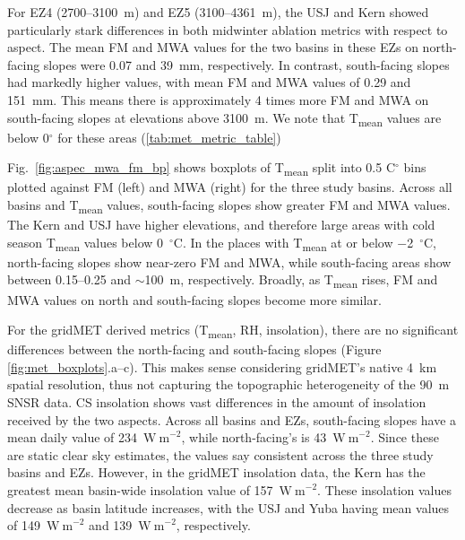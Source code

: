 For EZ4 (2700--3100~m) and EZ5 (3100--4361~m), the USJ and Kern showed particularly stark differences in both midwinter ablation metrics with respect to aspect. The mean FM and MWA values for the two basins in these EZs on north-facing slopes were 0.07 and 39~mm, respectively. In contrast, south-facing slopes had markedly higher values, with mean FM and MWA values of 0.29 and 151~mm. This means there is approximately 4 times more FM and MWA on south-facing slopes at elevations above 3100~m. We note that T\textsubscript{mean} values are below 0$^{\circ}$ for these areas (\ref{tab:met_metric_table})

Fig.~\ref{fig:aspec_mwa_fm_bp} shows boxplots of T\textsubscript{mean} split into 0.5 C$^{\circ}$ bins plotted against FM (left) and MWA (right) for the three study basins. Across all basins and T\textsubscript{mean} values, south-facing slopes show greater FM and MWA values.  The Kern and USJ have higher elevations, and therefore large areas with cold season T\textsubscript{mean} values below 0~$^{\circ}$C. In the places with T\textsubscript{mean} at or below $-$2~$^{\circ}$C, north-facing slopes show near-zero FM and MWA, while south-facing areas show between 0.15--0.25 and $\sim$100~m, respectively. Broadly, as T\textsubscript{mean} rises, FM and MWA values on north and south-facing slopes become more similar.

For the gridMET derived metrics (T\textsubscript{mean}, RH, insolation), there are no significant differences between the north-facing and south-facing slopes (Figure \ref{fig:met_boxplots}.a--c). This makes sense considering gridMET's native 4~km spatial resolution, thus not capturing the topographic heterogeneity of the 90~m SNSR data. CS insolation shows vast differences in the amount of insolation received by the two aspects. Across all basins and EZs, south-facing slopes have a mean daily value of 234~$\mathrm{W~m}^{-2}$, while north-facing's is 43~$\mathrm{W~m}^{-2}$. Since these are static clear sky estimates, the values say consistent across the three study basins and EZs. However, in the gridMET insolation data, the Kern has the greatest mean basin-wide insolation value of 157~$\mathrm{W~m}^{-2}$. These insolation values decrease as basin latitude increases, with the USJ and Yuba having mean values of 149~$\mathrm{W~m}^{-2}$ and 139~$\mathrm{W~m}^{-2}$, respectively.

